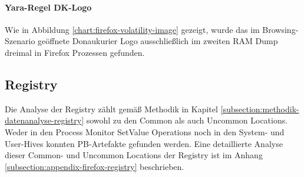 \paragraph*{Yara-Regel \grqq{}DK-Logo\grqq{}}
Wie in Abbildung \ref{chart:firefox-volatility-image} gezeigt, wurde das im Browsing-Szenario geöffnete Donaukurier Logo ausschließlich im zweiten RAM Dump dreimal in Firefox Prozessen gefunden.
\begin{table}[h!]
	\label{chart:firefox-volatility-image}
\end{table}




\subsection*{Registry}
\label{subsection:ergebnisse-firefox-registry}
Die Analyse der Registry zählt gemäß Methodik in Kapitel \ref{subsection:methodik-datenanalyse-registry} sowohl zu den Common als auch Uncommon Locations. Weder in den Process Monitor \grqq{}SetValue\grqq{} Operations noch in den System- und User-Hives konnten PB-Artefakte gefunden werden. Eine detaillierte Analyse dieser Common- und Uncommon Locations der Registry ist im Anhang \ref{subsection:appendix-firefox-registry} beschrieben.


